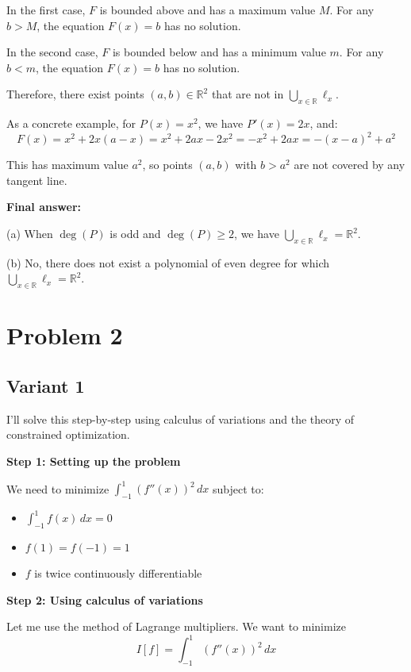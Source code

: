 \documentclass[12pt,a4paper]{article}
\theoremstyle{definition}
\begin{document}
        In the first case, $F$ is bounded above and has a maximum value $M$. For any $b > M$, the equation $F(x) = b$ has no solution.

        In the second case, $F$ is bounded below and has a minimum value $m$. For any $b < m$, the equation $F(x) = b$ has no solution.

        Therefore, there exist points $(a, b) \in \mathbb{R}^2$ that are not in $\bigcup_{x \in \mathbb{R}} \ell_x$.

        As a concrete example, for $P(x) = x^2$, we have $P'(x) = 2x$, and:
        $$F(x) = x^2 + 2x(a - x) = x^2 + 2ax - 2x^2 = -x^2 + 2ax = -(x-a)^2 + a^2$$

        This has maximum value $a^2$, so points $(a, b)$ with $b > a^2$ are not covered by any tangent line.

        \textbf{Final answer:}

        (a) When $\deg(P)$ is odd and $\deg(P) \geq 2$, we have $\bigcup_{x\in\mathbb{R}}\ell_x = \mathbb{R}^2$.

        (b) No, there does not exist a polynomial of even degree for which $\bigcup_{x\in\mathbb{R}}\ell_x = \mathbb{R}^2$.

\section{Problem 2}
\subsection{Variant 1}
        I'll solve this step-by-step using calculus of variations and the theory of constrained optimization.

        \textbf{Step 1: Setting up the problem}

        We need to minimize $\int_{-1}^{1} (f''(x))^2 \, dx$ subject to:
        \begin{itemize}
            \item $\int_{-1}^{1} f(x) \, dx = 0$
            \item $f(1) = f(-1) = 1$
            \item $f$ is twice continuously differentiable
        \end{itemize}

        \textbf{Step 2: Using calculus of variations}

        Let me use the method of Lagrange multipliers. We want to minimize
        $$I[f] = \int_{-1}^{1} (f''(x))^2 \, dx$$
\end{document}
